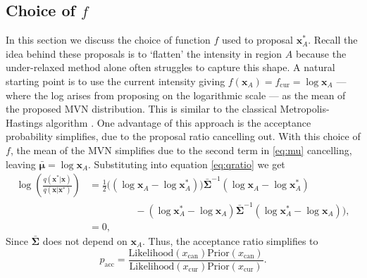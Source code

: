 \documentclass[oneside, 12 pt]{book}
\begin{document}
\subsection{Choice of $f$}\label{section:f}
In this section we discuss the choice of function $f$ used to proposal $\mathbf{x}^*_A$. Recall the idea behind these proposals is to `flatten' the intensity in region $A$ because the under-relaxed method alone often struggles to capture this shape. A natural starting point is to use the current intensity giving $f(\mathbf{x}_A) = f_{\mathrm{cur}} =\log\mathbf{x}_A$ --- where the log arises from proposing on the logarithmic scale --- as the mean of the proposed MVN distribution. This is similar to the classical Metropolis-Hastings algorithm \cite{}. One advantage of this approach is the acceptance probability simplifies, due to the proposal ratio cancelling out. With this choice of $f$, the mean of the MVN  simplifies due to the second term in \eqref{eq:mu} cancelling, leaving $\boldsymbol{\bar\mu} =  \log\mathbf{x}_{A}$. Substituting into equation \eqref{eq:qratio} we get 
\begin{align*}
	\log \left(\frac{q(\mathbf{x}^*|\mathbf{x})}{q(\mathbf{x}|\mathbf{x}^*)}\right) &=  \frac{1}{2}\bigg( (\log \mathbf{x}_{A} - \log \mathbf{x}^*_{A})) \boldsymbol{\bar \Sigma} ^{-1} (\log \mathbf{x}_{A}  - \log \mathbf{x}_{A}^*)  \\ & \text{ } \qquad \qquad  - (\log \mathbf{x}^*_{A} - \log \mathbf{x}_{A})  \boldsymbol{\bar \Sigma} ^{-1} (\log \mathbf{x}^*_{A} - \log \mathbf{x}_{A})\bigg), \\
	&= 0,
\end{align*} 
Since $\boldsymbol{\bar\Sigma}$ does not depend on $\mathbf{x}_A$.
Thus, the acceptance ratio simplifies to
\begin{equation*}
	p_{\mathrm{acc}}  = \frac{\mathrm{Likelihood}(x_{\mathrm{can}}) \mathrm{Prior}(x_{\mathrm{can}})}{\mathrm{Likelihood}(x_{\mathrm{cur}}) \mathrm{Prior}(x_{\mathrm{cur}})}.
\end{equation*}
\end{document}
